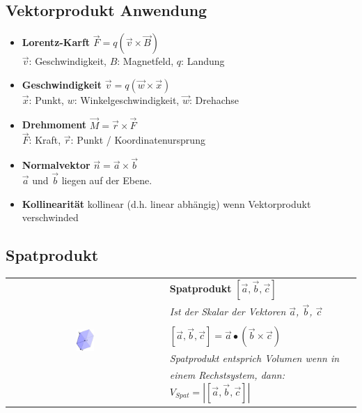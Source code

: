 \subsection{Vektorprodukt Anwendung}

\begin{itemize}
    \item \textbf{Lorentz-Karft} $\vec{F} = q(\vec{v} \times \vec{B})$ \\
          $\vec{v}$: Geschwindigkeit, $B$: Magnetfeld, $q$: Landung
    \item \textbf{Geschwindigkeit} $\vec{v} = q(\vec{w} \times \vec{x})$ \\
          $\vec{x}$: Punkt, $w$: Winkelgeschwindigkeit, $\vec{w}$: Drehachse
    \item \textbf{Drehmoment} $\vec{M} = \vec{r} \times \vec{F}$ \\
          $\vec{F}$: Kraft, $\vec{r}$: Punkt / Koordinatenursprung
    \item \textbf{Normalvektor} $\vec{n} = \vec{a} \times \vec{b}$ \\
          $\vec{a}$ und $\vec{b}$ liegen auf der Ebene.
    \item \textbf{Kollinearität} kollinear (d.h. linear abhängig) wenn Vektorprodukt verschwinded
\end{itemize}

\subsection{Spatprodukt}

\begin{tabular}{cl}
    \multirow{6}{*}{
        \includegraphics[width=0.12\textwidth]{assets/spatproduct.png}
    }
    & \textbf{Spatprodukt} $[\vec{a}, \vec{b}, \vec{c}]$ \\
    & \textit{Ist der Skalar der Vektoren $\vec{a}$, $\vec{b}$, $\vec{c}$} \\
    & \\
    & $[\vec{a}, \vec{b}, \vec{c}] = \vec{a} \bullet (\vec{b} \times \vec{c})$\\
    & \textit{Spatprodukt entsprich Volumen wenn in} \\
    & \textit{einem Rechstsystem, dann: $V_{Spat} = |[\vec{a}, \vec{b}, \vec{c}]|$} \\
\end{tabular} \\

